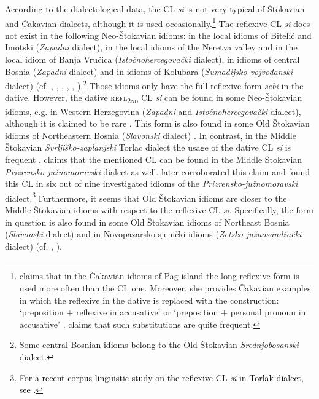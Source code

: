 \noindent According to the dialectological data, the CL \textit{si} is not very typical of Štokavian and Čakavian dialects, although it is used occasionally.\footnote{\citet[158]{Vranic03} claims that in the Čakavian idioms of Pag island the long reflexive form is used more often than the CL one. Moreover, she provides Čakavian examples in which the reflexive in the dative is replaced with the construction: ‘preposition $+$ reflexive in accusative’ or ‘preposition $+$ personal pronoun in accusative’ \citep[cf.][158]{Vranic03}. \citet[158]{Vranic03} claims that such substitutions are quite frequent.} The reflexive CL \textit{si} does not exist in the following Neo-Štokavian idioms: in the local idioms of Bitelić and Imotski (\textit{Zapadni} dialect), in the local idioms of the Neretva valley and in the local idiom of Banja Vrućica (\textit{Istočnohercegovački} dialect), in idioms of central Bosnia (\textit{Zapadni} dialect) and in idioms of Kolubara (\textit{Šumadijsko-vojvođanski} dialect) (cf. \citealt[192]{Curkovic14}, \citealt[120]{Simundic71}, \citealt[142]{VuksaNahod14}, \citealt[371]{Dragicevic07}, \citealt[207]{Peco90}, \citealt[255]{Radovanovic06}).\footnote{Some central Bosnian idioms belong to the Old Štokavian \textit{Srednjobosanski} dialect.} Those idioms only have the full reflexive form \textit{sebi} in the dative. However, the dative \textsc{refl\textsubscript{2nd}} CL \textit{si} can be found in some Neo-Štokavian idioms, e.g. in Western Herzegovina (\textit{Zapadni} and \textit{Istočnohercegovački} dialect), although it is claimed to be rare \citep[cf.][311]{Peco07b}. This form is also found in some Old Štokavian idioms of Northeastern Bosnia (\textit{Slavonski} dialect) \citep[cf.][269]{Peco85}. In contrast, in the Middle Štokavian \textit{Svrljiško-zaplanjski} Torlac dialect the usage of the dative CL \textit{si} is frequent \citep[cf.][255]{Okuka08}. \citet[205]{Ivic57} claims that the mentioned CL can be found in the Middle Štokavian \textit{Prizrensko-južnomoravski} dialect as well. \citet[45]{Mladenovic10} later corroborated this claim and found this CL in six out of nine investigated idioms of the \textit{Prizrensko-južnomoravski} dialect.\footnote{\textcolor{black}{For a recent corpus linguistic study on the reflexive CL \textit{si} in Torlak dialect, see \citet[]{Cirkovic21}}.} Furthermore, it seems that Old Štokavian idioms are closer to the Middle Štokavian idioms with respect to the reflexive CL \textit{si}. Specifically, the form in question is also found in some Old Štokavian idioms of Northeast Bosnia (\textit{Slavonski} dialect) and in Novopazarsko-sjenički idioms (\textit{Zetsko-južnosandžački} dialect) (cf. \citealt[269]{Peco85}, \citealt[90]{Barjaktarevic66}). 


